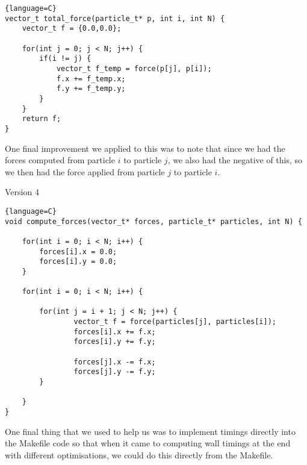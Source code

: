 \begin{lstlisting}{language=C}
vector_t total_force(particle_t* p, int i, int N) {
    vector_t f = {0.0,0.0};

    for(int j = 0; j < N; j++) {
        if(i != j) {
            vector_t f_temp = force(p[j], p[i]);
            f.x += f_temp.x;
            f.y += f_temp.y;
        }
    }
    return f;
}
\end{lstlisting}

One final improvement we applied to this was to note that since we had the forces computed from particle $i$ to particle $j$, we also had the negative of this, so we then had the force applied from particle $j$ to particle $i$.

\begin{center}
    Version 4
\end{center}

\begin{lstlisting}{language=C}
void compute_forces(vector_t* forces, particle_t* particles, int N) {

    for(int i = 0; i < N; i++) {
        forces[i].x = 0.0;
        forces[i].y = 0.0;
    }

    for(int i = 0; i < N; i++) {

        for(int j = i + 1; j < N; j++) {
                vector_t f = force(particles[j], particles[i]);
                forces[i].x += f.x;
                forces[i].y += f.y;

                forces[j].x -= f.x;
                forces[j].y -= f.y;
        }

    }
}
\end{lstlisting}

One final thing that we used to help us was to implement timings directly into the Makefile code so that when it came to computing wall timings at the end with different optimisations, we could do this directly from the Makefile.
\newpage
